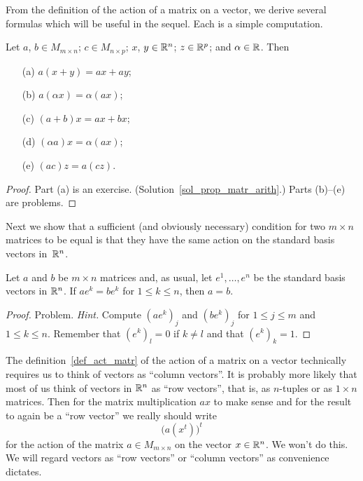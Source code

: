From the definition of the action of a matrix on a vector, we derive several formulas which
will be useful in the sequel. Each is a simple computation.

\begin{prop}\label{prop_matr_arith} Let $a$, $b \in M_{m \times n}$; $c \in M_{n \times p}$;
$x$, $y \in \mathbb{R}^n$; $z \in \mathbb{R}^p$; and $\alpha \in \mathbb{R}$.  Then
 \begin{enumerate}
  \item[(a)] $a(x + y) = ax + ay$;
  \item[(b)] $a(\alpha x) = \alpha(ax)$;
  \item[(c)] $(a + b)x = ax + bx$;
  \item[(d)] $(\alpha a)x = \alpha(ax)$;
  \item[(e)] $(ac)z = a(cz)$.
 \end{enumerate}
\end{prop}

\begin{proof} Part (a) is an exercise. (Solution~\ref{sol_prop_matr_arith}.)
Parts (b)--(e) are problems.  \ns \end{proof}

Next we show that a sufficient (and obviously necessary) condition for two $m \times n$
matrices to be equal is that they have the same action on the standard basis vectors
in~$\mathbb{R}^n$.

\begin{prop}\label{prop_mrlt_bas}  Let $a$ and $b$ be $m \times n$ matrices and, as usual,
let $e^1, \dots, e^n$ be the standard basis vectors in $\mathbb{R}^n$.  If $ae^k = be^k$ for $1 \le k
\le n$, then $a = b$.
\end{prop}

\begin{proof} Problem.  \emph{Hint.}  Compute $(ae^k)_j$ and $(be^k)_j$ for $1 \le j \le m$
and $1 \le k \le n$.  Remember that $(e^k)_l = 0$ if $k \ne l$ and that $(e^k)_k = 1$.  \ns
\end{proof}

\begin{rem} The definition~\ref{def_act_matr} of the action of a matrix on a vector technically
requires us to think of vectors as ``column vectors''.  It is probably more likely that most
of us think of vectors in $\mathbb{R}^n$ as
``row vectors'', that is, as $n$-tuples or as $1 \times n$ matrices. Then for the matrix
multiplication $ax$ to make sense and for the result to again be a ``row vector'' we really
should write
  \[ \bigl(a(x^t)\bigr)^t \]
for the action of the matrix $a \in M_{m \times n}$ on the vector $x \in \mathbb{R}^n$. We won't do
this.  We will regard vectors as ``row vectors'' or ``column vectors'' as convenience
dictates.
\end{rem}

